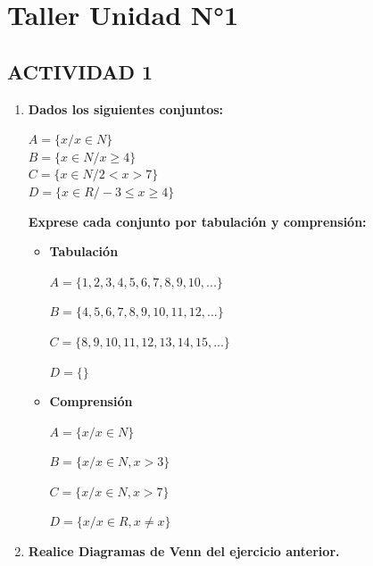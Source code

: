 \documentclass[12pt]{article}
\begin{document}
    
  
    \section*{\centering Taller Unidad N°1}

        \subsection*{\textbf{\centering ACTIVIDAD 1}}

            \begin{enumerate}
                \item \textbf{Dados los siguientes conjuntos:}\par$A = \{x / x \in N\}$\\$B = \{ x \in N / x \geq 4 \}$\\$C = \{ x \in N / 2 < x > 7 \}$\\$D = \{ x \in R / -3 \leq x \geq 4 \}$\par\textbf{Exprese cada conjunto por tabulación y comprensión:} 
                    \begin{itemize}
                        \item \textbf{Tabulación}
                            \par$A = \{1, 2, 3, 4, 5, 6, 7, 8, 9, 10, ...\}$
                            \par$B = \{4, 5 ,6, 7, 8, 9, 10, 11, 12, ...\}$
                            \par$C = \{8, 9, 10, 11, 12, 13, 14, 15, ...\}$
                            \par$D = \{\}$
                        \item \textbf{Comprensión}
                            \par$A = \{x / x \in N\}$
                            \par$B = \{x / x \in N, x > 3\}$
                            \par$C = \{x / x \in N, x > 7\}$
                            \par$D = \{x / x \in R, x \neq x\}$
                    \end{itemize}
                \item \textbf{Realice Diagramas de Venn del ejercicio anterior.}
                    \begin{figure}[h!]

\end{figure}
\end{enumerate}
\end{document}
